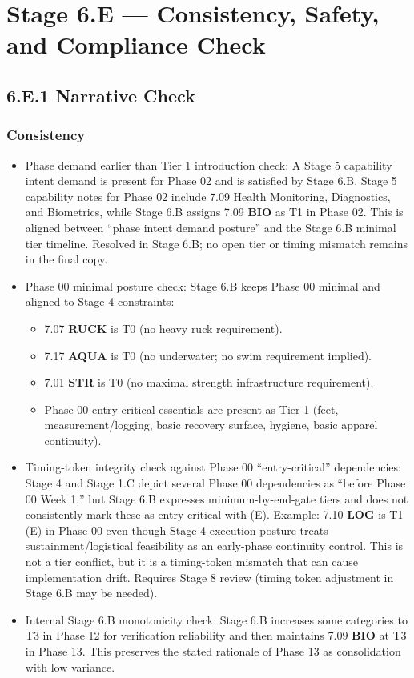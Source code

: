 \documentclass[10pt]{article}
\begin{document}
\section*{Stage 6.E — Consistency, Safety, and Compliance Check}
{}

\subsection*{6.E.1 Narrative Check}
{}

\subsubsection*{Consistency}

\begin{itemize}
\item Phase demand earlier than Tier 1 introduction check: A Stage 5 capability intent demand is present for Phase 02 and is satisfied by Stage 6.B. Stage 5 capability notes for Phase 02 include 7.09 Health Monitoring, Diagnostics, and Biometrics, while Stage 6.B assigns 7.09 \textbf{BIO} as T1 in Phase 02. This is aligned between “phase intent demand posture” and the Stage 6.B minimal tier timeline. Resolved in Stage 6.B; no open tier or timing mismatch remains in the final copy.
\item Phase 00 minimal posture check: Stage 6.B keeps Phase 00 minimal and aligned to Stage 4 constraints:
  \begin{itemize}
  \item 7.07 \textbf{RUCK} is T0 (no heavy ruck requirement).
  \item 7.17 \textbf{AQUA} is T0 (no underwater; no swim requirement implied).
  \item 7.01 \textbf{STR} is T0 (no maximal strength infrastructure requirement).
  \item Phase 00 entry-critical essentials are present as Tier 1 (feet, measurement/logging, basic recovery surface, hygiene, basic apparel continuity).
  \end{itemize}
\item Timing-token integrity check against Phase 00 “entry-critical” dependencies: Stage 4 and Stage 1.C depict several Phase 00 dependencies as “before Phase 00 Week 1,” but Stage 6.B expresses minimum-by-end-gate tiers and does not consistently mark these as entry-critical with (E). Example: 7.10 \textbf{LOG} is T1 (E) in Phase 00 even though Stage 4 execution posture treats sustainment/logistical feasibility as an early-phase continuity control. This is not a tier conflict, but it is a timing-token mismatch that can cause implementation drift. Requires Stage 8 review (timing token adjustment in Stage 6.B may be needed).
\item Internal Stage 6.B monotonicity check: Stage 6.B increases some categories to T3 in Phase 12 for verification reliability and then maintains 7.09 \textbf{BIO} at T3 in Phase 13. This preserves the stated rationale of Phase 13 as consolidation with low variance.
\end{itemize}
\end{document}
